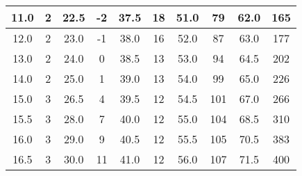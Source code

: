 \begin{table*}
\begin{ruledtabular}
\begin{tabular}{|cccccccccc|}
        \multicolumn{1}{|c|}{11.0}      & \multicolumn{1}{c|}{2}          & \multicolumn{1}{c|}{22.5}      & \multicolumn{1}{c|}{-2}         & \multicolumn{1}{c|}{37.5}      & \multicolumn{1}{c|}{18}         & \multicolumn{1}{c|}{51.0}      & \multicolumn{1}{c|}{79}         & \multicolumn{1}{c|}{62.0}      & 165        \\ \hline
        \multicolumn{1}{|c|}{12.0}      & \multicolumn{1}{c|}{2}          & \multicolumn{1}{c|}{23.0}      & \multicolumn{1}{c|}{-1}         & \multicolumn{1}{c|}{38.0}      & \multicolumn{1}{c|}{16}         & \multicolumn{1}{c|}{52.0}      & \multicolumn{1}{c|}{87}         & \multicolumn{1}{c|}{63.0}      & 177        \\ \hline
        \multicolumn{1}{|c|}{13.0}      & \multicolumn{1}{c|}{2}          & \multicolumn{1}{c|}{24.0}      & \multicolumn{1}{c|}{0}          & \multicolumn{1}{c|}{38.5}      & \multicolumn{1}{c|}{13}         & \multicolumn{1}{c|}{53.0}      & \multicolumn{1}{c|}{94}         & \multicolumn{1}{c|}{64.5}      & 202        \\ \hline
        \multicolumn{1}{|c|}{14.0}      & \multicolumn{1}{c|}{2}          & \multicolumn{1}{c|}{25.0}      & \multicolumn{1}{c|}{1}          & \multicolumn{1}{c|}{39.0}      & \multicolumn{1}{c|}{13}         & \multicolumn{1}{c|}{54.0}      & \multicolumn{1}{c|}{99}         & \multicolumn{1}{c|}{65.0}      & 226        \\ \hline
        \multicolumn{1}{|c|}{15.0}      & \multicolumn{1}{c|}{3}          & \multicolumn{1}{c|}{26.5}      & \multicolumn{1}{c|}{4}          & \multicolumn{1}{c|}{39.5}      & \multicolumn{1}{c|}{12}         & \multicolumn{1}{c|}{54.5}      & \multicolumn{1}{c|}{101}        & \multicolumn{1}{c|}{67.0}      & 266        \\ \hline
        \multicolumn{1}{|c|}{15.5}      & \multicolumn{1}{c|}{3}          & \multicolumn{1}{c|}{28.0}      & \multicolumn{1}{c|}{7}          & \multicolumn{1}{c|}{40.0}      & \multicolumn{1}{c|}{12}         & \multicolumn{1}{c|}{55.0}      & \multicolumn{1}{c|}{104}        & \multicolumn{1}{c|}{68.5}      & 310        \\ \hline
        \multicolumn{1}{|c|}{16.0}      & \multicolumn{1}{c|}{3}          & \multicolumn{1}{c|}{29.0}      & \multicolumn{1}{c|}{9}          & \multicolumn{1}{c|}{40.5}      & \multicolumn{1}{c|}{12}         & \multicolumn{1}{c|}{55.5}      & \multicolumn{1}{c|}{105}        & \multicolumn{1}{c|}{70.5}      & 383        \\ \hline
        \multicolumn{1}{|c|}{16.5}      & \multicolumn{1}{c|}{3}          & \multicolumn{1}{c|}{30.0}      & \multicolumn{1}{c|}{11}         & \multicolumn{1}{c|}{41.0}      & \multicolumn{1}{c|}{12}         & \multicolumn{1}{c|}{56.0}      & \multicolumn{1}{c|}{107}        & \multicolumn{1}{c|}{71.5}      & 400        \\ \hline

\end{tabular}
\end{ruledtabular}
\end{table*}
